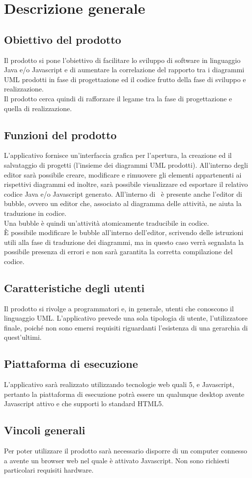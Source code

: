 \documentclass[../AnalisiDeiRequisiti.tex]{subfiles}
\begin{document}
	\section{Descrizione generale}
		\subsection{Obiettivo del prodotto}
			Il prodotto si pone l'obiettivo di facilitare lo sviluppo di software in
			linguaggio Java e/o Javascript e di aumentare la correlazione del rapporto tra
			i diagrammi UML prodotti in fase di progettazione ed il codice frutto della
			fase di sviluppo e realizzazione.\\
			Il prodotto cerca quindi di rafforzare il legame tra la fase di progettazione
			e quella di realizzazione.
		\subsection{Funzioni del prodotto}
			L'applicativo fornisce un'interfaccia grafica per l'apertura, la
			creazione ed il salvataggio di progetti (l'insieme dei diagrammi UML prodotti).
			All'interno degli editor sarà possibile creare, modificare e rimuovere gli
			elementi appartenenti ai rispettivi diagrammi ed inoltre, sarà possibile
			visualizzare ed esportare il relativo codice Java e/o Javascript generato.
			All'interno di \progetto\ è presente anche l'editor di bubble, ovvero un editor
			che, associato al diagramma delle attività, ne aiuta la traduzione in codice.\\
			Una bubble è quindi un'attività atomicamente traducibile in codice.\\
			È possibile modificare le bubble all'interno dell'editor, scrivendo delle istruzioni
			utili alla fase di traduzione dei diagrammi, ma in questo caso verrà segnalata la
			possibile presenza di errori e non sarà garantita la corretta compilazione
			del codice.
		\subsection{Caratteristiche degli utenti}
			Il prodotto si rivolge a programmatori e, in generale, utenti che conoscono
			il linguaggio UML. L'applicativo prevede una sola tipologia di utente,
			l'utilizzatore finale, poiché non sono emersi requisiti riguardanti
			l'esistenza di una gerarchia di quest'ultimi.
		\subsection{Piattaforma di esecuzione}
			L'applicativo sarà realizzato utilizzando tecnologie web quali 5,
			 e Javascript, pertanto la piattaforma di esecuzione potrà essere un
			qualunque  desktop avente Javascript attivo e che supporti lo standard HTML5.
		\subsection{Vincoli generali}
			Per poter utilizzare il prodotto sarà necessario disporre di un computer
			connesso a  avente un browser web nel quale è attivato
			Javascript. Non sono richiesti particolari requisiti hardware.
\end{document}
